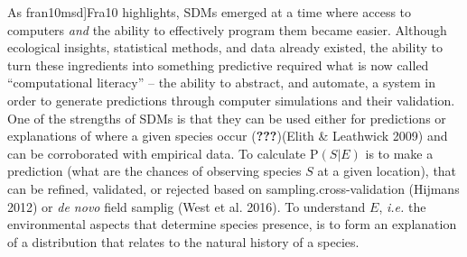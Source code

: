 \documentclass[11pt,serif]{article}
\begin{document}
As
\color{gray}{[}fran10msd{]}\color{black}\color{purple}Fra10\color{black}
highlights, SDMs emerged at a time where access to computers \emph{and}
the ability to effectively program them became easier. Although
ecological insights, statistical methods, and data already existed, the
ability to turn these ingredients into something predictive required
what is now called ``computational literacy'' -- the ability to
abstract, and automate, a system in order to generate predictions
through computer simulations and their validation. One of the strengths
of SDMs is that they can be used either for predictions or explanations
of where a given species occur
\color{gray}({\textbf{???}})\color{black}\color{purple}(Elith \&
Leathwick 2009)\color{black} and can be corroborated with empirical
data. To calculate \(\text{P}(S | E)\) is to make a prediction (what are
the chances of observing species \(S\) at a given location), that can be
refined, validated, or rejected based on
\color{gray}sampling.\color{black}\color{purple}cross-validation
(Hijmans 2012) or \emph{de novo}\color{black} \color{purple}field
samplig (West et al. 2016).\color{black} To understand \(E\),
\emph{i.e.} the environmental aspects that determine species presence,
is to form an explanation of a distribution that relates to the natural
history of a species.
\end{document}
